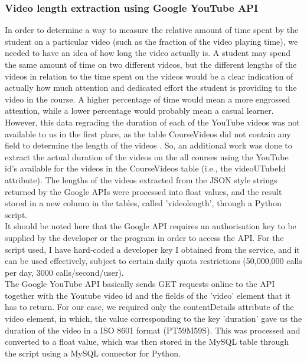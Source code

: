 \documentclass[16pt]{report}
\begin{document}
\subsubsection{Video length extraction using Google YouTube API}

In order to determine a way to measure the relative amount of time spent by the student on a particular video (such as the fraction of the video playing time), we needed to have an idea of how long the video actually is. A student may spend the same amount of time on two different videos, but the different lengths of the videos in relation to the time spent on the videos would be a clear indication of actually how much attention and dedicated effort the student is providing to the video in the course. A higher percentage of time would mean a more engrossed attention, while a lower percentage would probably mean a casual learner.\\

However, this data regrading the duration of each of the YouTube videos was not available to us in the first place, as the table CourseVideos did not contain any field to determine the length of the videos . So, an additional work was done to extract the actual duration of the videos on the all courses using the YouTube id's available for the videos in the CourseVideos table (i.e., the videoUTubeId attribute). The lengths of the videos extracted from the JSON style strings returned by the Google APIs were processed into float values, and the result stored in a new column in the tables, called 'videolength', through a Python script.\\

It should be noted here that the Google API requires an authorisation key to be supplied by the developer or the program in order to access the API. For the script used, I have hard-coded a developer key I obtained from the service, and it can be used effectively, subject to certain daily quota restrictions (50,000,000 calls per day, 3000 calls/second/user).\\

The Google YouTube API basically sends GET requests online to the API together with the Youtube video id and the fields of the 'video' element that it has to return. For our case, we required only the contentDetails attribute of the video element, in which, the value corresponding to the key 'duration' gave us the duration of the video in a ISO 8601 format (PT59M59S). This was processed and converted to a float value, which was then stored in the MySQL table through the script using a MySQL connector for Python.\\
\end{document}
